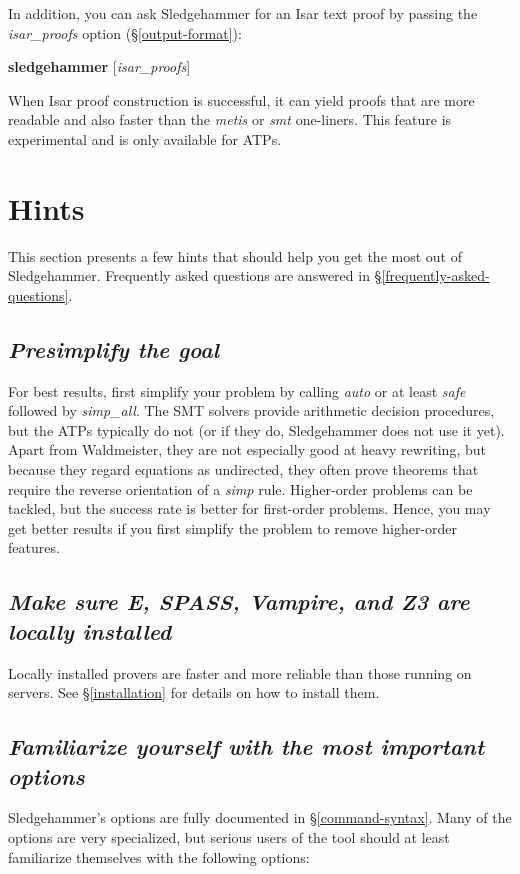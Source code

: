 \documentclass[a4paper,12pt]{article}
\begin{document}
In addition, you can ask Sledgehammer for an Isar text proof by passing the
\textit{isar\_proofs} option (\S\ref{output-format}):

\prew
\textbf{sledgehammer} [\textit{isar\_proofs}]
\postw

When Isar proof construction is successful, it can yield proofs that are more
readable and also faster than the \textit{metis} or \textit{smt} one-liners.
This feature is experimental and is only available for ATPs.

\section{Hints}
\label{hints}

This section presents a few hints that should help you get the most out of
Sledgehammer. Frequently asked questions are answered in
\S\ref{frequently-asked-questions}.

\newcommand\point[1]{\subsection{\emph{#1}}}

\point{Presimplify the goal}

For best results, first simplify your problem by calling \textit{auto} or at
least \textit{safe} followed by \textit{simp\_all}. The SMT solvers provide
arithmetic decision procedures, but the ATPs typically do not (or if they do,
Sledgehammer does not use it yet). Apart from Waldmeister, they are not
especially good at heavy rewriting, but because they regard equations as
undirected, they often prove theorems that require the reverse orientation of a
\textit{simp} rule. Higher-order problems can be tackled, but the success rate
is better for first-order problems. Hence, you may get better results if you
first simplify the problem to remove higher-order features.

\point{Make sure E, SPASS, Vampire, and Z3 are locally installed}

Locally installed provers are faster and more reliable than those running on
servers. See \S\ref{installation} for details on how to install them.

\point{Familiarize yourself with the most important options}

Sledgehammer's options are fully documented in \S\ref{command-syntax}. Many of
the options are very specialized, but serious users of the tool should at least
familiarize themselves with the following options:
\end{document}

